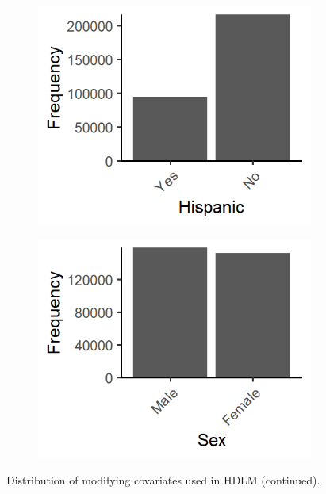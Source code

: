 \documentclass[12pt]{article}
\begin{document}
\begin{figure}[!ht]
\begin{subfigure}{.3\textwidth}
        \includegraphics[width=\textwidth]{supp-img/dens_hisp.png}
    \vspace{.5cm}
    \end{subfigure}
    \begin{subfigure}{.3\textwidth}
        \includegraphics[width=\textwidth]{supp-img/dens_sex.png}
    \end{subfigure}
    \caption{Distribution of modifying covariates used in HDLM (continued).}
    \label{fig:mod-dens2}
\end{figure}
\end{document}
